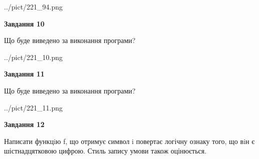 \documentclass[12pt, ukrainian]{article}
\begin{document}
{\begin {large}
\begin{center}
	{../pict/221_94.png}
\end{center}
\newpage

{\begin {center}\textbf{Завдання 10}\end {center}}

Що буде виведено за виконання програми?\par
\begin{center}
	{../pict/221_10.png}
\end{center}
\newpage

{\begin {center}\textbf{Завдання 11}\end {center}}

Що буде виведено за виконання програми?\par
\begin{center}
	{../pict/221_11.png}
\end{center}
\newpage

{\begin {center}\textbf{Завдання 12}\end {center}}


Написати функцiю f, що отримує символ i повертає логічну ознаку того, що вiн є шістнадцятковою цифрою. Стиль запису умови також оцінюється.\par
\newpage

\end {large}}
\end{document}
